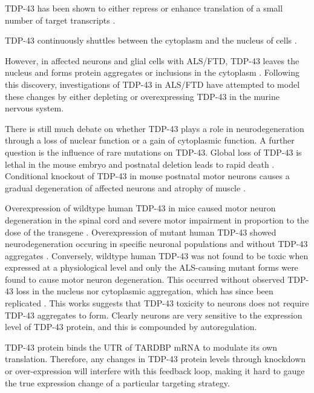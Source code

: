 


TDP-43 has been shown to either repress or enhance translation of a small number of target transcripts \citep{Majumder2012, Majumder2016, Neelagandan2018}.



TDP-43 continuously shuttles between the cytoplasm and the nucleus of cells \citep{Ayala2008}. 

However, in affected neurons and glial cells with ALS/FTD, TDP-43 leaves the nucleus and forms protein aggregates or inclusions in the cytoplasm \citep{Neumann2006-re}. 
Following this discovery, investigations of TDP-43 in ALS/FTD have attempted to model these changes by either depleting or overexpressing TDP-43 in the murine nervous system. 

There is still much debate on whether TDP-43 plays a role in neurodegeneration through a loss of nuclear function or a gain of cytoplasmic function.  
A further question is the influence of rare mutations on TDP-43.
Global loss of TDP-43 is lethal in the mouse embryo \citep{Kraemer2010} and postnatal deletion leads to rapid death \citep{Chiang2010}. 
Conditional knockout of TDP-43 in mouse postnatal motor neurons causes a gradual degeneration of affected neurons and atrophy of muscle \citep{Iguchi2013}. 

Overexpression of wildtype human TDP-43 in mice caused motor neuron degeneration in the spinal cord and severe motor impairment in proportion to the dose of the transgene \citep{Wils2010, Shan2010}.
Overexpression of mutant human TDP-43 showed neurodegeneration occuring in specific neuronal populations and without TDP-43 aggregates \citep{Wegorzewska2009} . 
Conversely, wildtype human TDP-43 was not found to be toxic when expressed at a physiological level \citep{Arnold2013} and only the ALS-causing mutant forms were found to cause motor neuron degeneration. 
This occurred without observed TDP-43 loss in the nucleus nor cytoplasmic aggregation, which has since been replicated \citep{Igaz2011}. 
This works suggests that TDP-43 toxicity to neurons does not require TDP-43 aggregates to form.
Clearly neurons are very sensitive to the expression level of TDP-43 protein, and this is compounded by autoregulation. 

TDP-43 protein binds the UTR of TARDBP mRNA to modulate its own translation\citep{Ayala2011,Koyama2016}. 
Therefore, any changes in TDP-43 protein levels through knockdown or over-expression will interfere with this feedback loop, making it hard to gauge the true expression change of a particular targeting strategy. 





